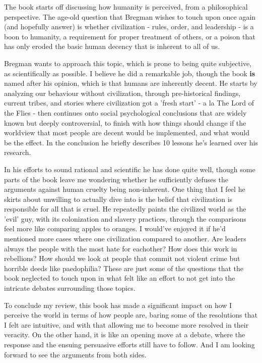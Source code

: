 The book starts off discussing how humanity is perceived, from a philosophical perspective. The age-old question that Bregman wishes to touch upon once again (and hopefully answer) is whether civilization - rules, order, and leadership - is a boon to humanity, a requirement for proper treatment of others, or a poison that has only eroded the basic human decency that is inherent to all of us.

Bregman wants to approach this topic, which is prone to being quite subjective, as scientifically as possible. I believe he did a remarkable job, though the book \textbf{is} named after his opinion, which is that humans are inherently decent. He starts by analyzing our behaviour without civilization, through pre-historical findings, current tribes, and stories where civilization got a 'fresh start' - a la The Lord of the Flies - then continues onto social psychological conclusions that are widely known but deeply controversial, to finish with how things should change if the worldview that most people are decent would be implemented, and what would be the effect. In the conclusion he briefly describes 10 lessons he's learned over his research.

In his efforts to sound rational and scientific he has done quite well, though some parts of the book leave me wondering whether he sufficiently defuses the arguments against human cruelty being non-inherent. One thing that I feel he skirts about unwilling to actually dive into is the belief that civilization is responsible for all that is cruel. He repeatedly paints the civilized world as the 'evil' guy, with its colonization and slavery practices, through the comparisons feel more like comparing apples to oranges. I would've enjoyed it if he'd mentioned more cases where one civilization compared to another. Are leaders always the people with the most hate for eachother? How does this work in rebellions? How should we look at people that commit not violent crime but horrible deeds like paedophilia? These are just some of the questions that the book neglected to touch upon in what felt like an effort to not get into the intricate debates surrounding those topics. 

To conclude my review, this book has made a significant impact on how I perceive the world in terms of how people are, baring some of the resolutions that I felt are intuitive, and with that allowing me to become more resolved in their veracity. On the other hand, it is like an opening move at a debate, where the response and the ensuing persuasive efforts still have to follow. And I am looking forward to see the arguments from both sides.